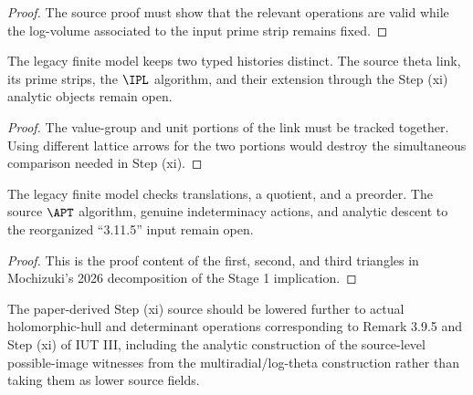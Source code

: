 \begin{proof}
  The source proof must show that the relevant operations are valid while the
  \qPilot{} log-volume associated to the input prime strip remains fixed.
\end{proof}

\begin{theorem}
  \label{thm:construct-ipl}
  \notready
  The legacy finite model keeps two typed histories distinct. The source
  theta link, its prime strips, the \(\IPL\) algorithm, and their extension
  through the Step (xi) analytic objects remain open.
\end{theorem}

\begin{proof}
  The value-group and unit portions of the link must be tracked together.
  Using different lattice arrows for the two portions would destroy the
  simultaneous comparison needed in Step (xi).
\end{proof}

\begin{theorem}
  \label{thm:construct-apt}
  \notready
  The legacy finite model checks translations, a quotient, and a preorder.
  The source \(\APT\) algorithm, genuine indeterminacy actions, and analytic
  descent to the reorganized ``3.11.5'' input remain open.
\end{theorem}

\begin{proof}
  This is the proof content of the first, second, and third triangles in
  Mochizuki's 2026 decomposition of the Stage 1 implication.
\end{proof}

\begin{theorem}
  \label{thm:construct-hdd}
  \notready
  The paper-derived Step (xi) source should be lowered further to actual
  holomorphic-hull and determinant operations corresponding to Remark 3.9.5
  and Step (xi) of IUT III, including the analytic construction of the
  source-level possible-image witnesses from the multiradial/log-theta
  construction rather than taking them as lower source fields.
\end{theorem}

